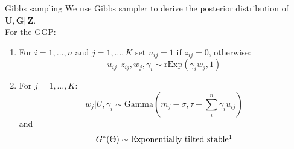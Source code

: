 \documentclass[aspectratio=169,xcolor=dvipsnames]{beamer}
\begin{document}
\begin{frame}{Gibbs sampling}
We use Gibbs sampler to derive the posterior distribution of $\boldsymbol{U, G | \, Z}$.  \\
\vspace{5pt}
\underline{For the GGP}:
\begin{enumerate}
    \item For $i= 1, \dots, n$ and $j= 1, \dots, K$ set $u_{ij}=1$ if $z_{ij}=0$, otherwise:
    $$
    u_{ij}| \, z_{ij}, w_{j}, \gamma_i \sim \text{rExp}(\gamma_{i} w_{j},1)
    $$
    \item For $j= 1, \dots, K$:
    $$ %
    w_{j}| U, \gamma_{i} \sim \text{Gamma}(m_{j} - \sigma, \tau + \sum_{i}^{n}\gamma_i u_{ij} ) 
    $$
    and
    $$ %
    G^{*}(\Theta) \sim \text{Exponentially tilted stable}\footnotemark
    $$
    \end{enumerate}
\end{frame}
\end{document}
